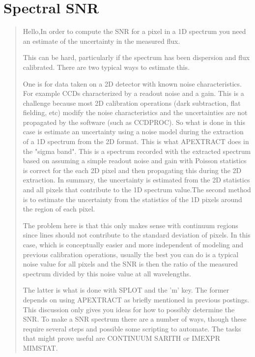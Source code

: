 \renewcommand{\footerfilename}{SNR.tex}

\section{Spectral SNR} \label{sec:Spectral SNR}
\begin{quote}


Hello,In order to compute the SNR for a pixel in a 1D spectrum you
need an estimate of the uncertainty in the measured flux. 

This can be hard, particularly if the spectrum has been dispersion and
flux calibrated. There are two typical ways to estimate this.

One is for data taken on a 2D detector with known noise
characteristics. For example CCDs characterized by a readout noise and
a gain. This is a challenge because most 2D calibration operations
(dark subtraction, flat fielding, etc) modify the noise
characteristics and the uncertainties are not propagated by the
software (such as CCDPROC). So what is done in this case is estimate
an uncertainty using a noise model during the extraction of a 1D
spectrum from the 2D format. This is what APEXTRACT does in the "sigma
band". This is a spectrum recorded with the extracted spectrum based
on assuming a simple readout noise and gain with Poisson statistics is
correct for the each 2D pixel and then propagating this during the 2D
extraction. In summary, the uncertainty is estimated from the 2D
statistics and all pixels that contribute to the 1D spectrum value.The
second method is to estimate the uncertainty from the statistics of
the 1D pixels around the region of each pixel. 

The problem here is that this only makes sense with continuum regions
since lines should not contribute to the standard deviation of
pixels. In this case, which is conceptually easier and more
independent of modeling and previous calibration operations, usually
the best you can do is a typical noise value for all pixels and the
SNR is then the ratio of the measured spectrum divided by this noise
value at all wavelengths.

The latter is what is done with SPLOT and the 'm' key. The former
depends on using APEXTRACT as briefly mentioned in previous
postings. This discussion only gives you ideas for how to possibly
determine the SNR. To make a SNR spectrum there are a number of ways,
though these require several steps and possible some scripting to
automate. The tasks that might prove useful are CONTINUUM SARITH or
IMEXPR MIMSTAT.


\end{quote}
